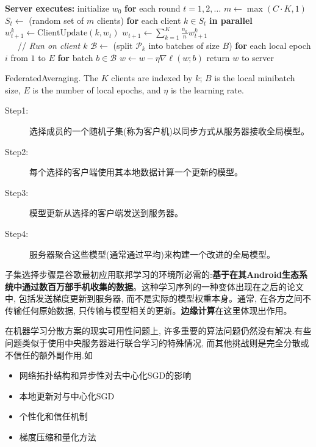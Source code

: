 \documentclass[a4paper]{article}
\newcommand{\FOR}{ \State \textbf{for }}
\newcommand{\lbs}{\ensuremath{B}}
\newcommand{\lepochs}{\ensuremath{E}}
\begin{document}
   \begin{algorithm}[t]
    \begin{algorithmic}
    \State \textbf{Server executes:}
       \State initialize $w_0$
       \FOR{each round $t = 1,  2,  \dots$} 
       \hspace{1em} \State $m \leftarrow \max( C\cdot K,  1)$
          \State $S_t \leftarrow$ (random set of $m$ clients)
           \FOR{each client $k \in S_t$ \textbf{in parallel}}
            \State $w_{t+1}^k \leftarrow \text{ClientUpdate}(k,  w_t)$ 
           \State $w_{t+1} \leftarrow \sum_{k=1}^K \frac{n_k}{n} w_{t+1}^k$ \\

     \ \ \  // \emph{Run on client $k$}
      \State $\mathcal{B} \leftarrow$ (split $\mathcal{P}_k$ into batches of size $\lbs$)
       \FOR{each local epoch $i$ from $1$ to $ \lepochs$}
      \FOR{batch $b \in \mathcal{B}$}
         \State $w \leftarrow w - \eta \nabla \ell(w; b)$
       \State return $w$ to server
    \end{algorithmic}
    \caption{FederatedAveraging. The $K$
      clients are indexed by $k$; $\lbs$ is the local minibatch size, 
      $\lepochs$ is the number of local epochs,  and $\eta$ is the learning
      rate.} 
    \label{alg:fedavg}
    \end{algorithm}
     
    \begin{description}
        \item[Step1:] 选择成员的一个随机子集(称为客户机)以同步方式从服务器接收全局模型。
        \item[Step2:] 每个选择的客户端使用其本地数据计算一个更新的模型。
        \item[Step3:] 模型更新从选择的客户端发送到服务器。 
        \item[Step4:] 服务器聚合这些模型(通常通过平均)来构建一个改进的全局模型。 
    \end{description}

子集选择步骤是谷歌最初应用联邦学习的环境所必需的:\textbf{基于在其Android生态系统中通过数百万部手机收集的数据}。这种学习序列的一种变体出现在之后的论文中, 包括发送梯度更新到服务器, 而不是实际的模型权重本身。通常, 在各方之间不传输任何原始数据, 只传输与模型相关的更新。\textbf{边缘计算}在这里体现出作用。
 
在机器学习分散方案的现实可用性问题上, 许多重要的算法问题仍然没有解决.有些问题类似于使用中央服务器进行联合学习的特殊情况, 而其他挑战则是完全分散或不信任的额外副作用.如
\begin{itemize}
    
\item 网络拓扑结构和异步性对去中心化SGD的影响
\item 本地更新对与中心化SGD
\item 个性化和信任机制
\item 梯度压缩和量化方法
\end{itemize}
\end{document}
